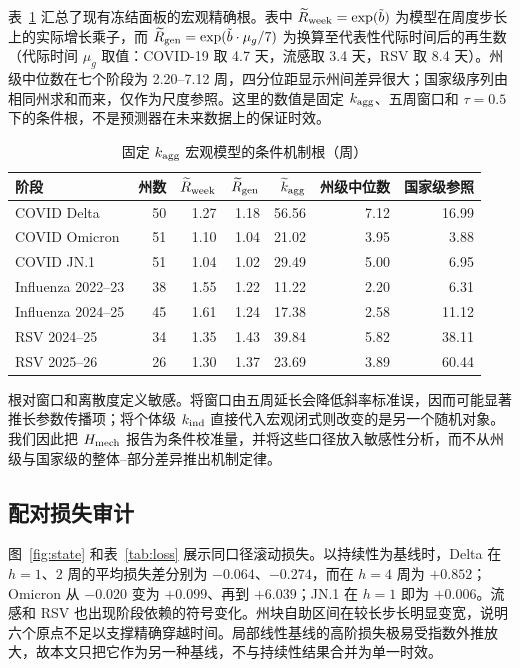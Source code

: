 \documentclass[11pt,a4paper]{article}
\begin{document}
表~\ref{tab:horizons} 汇总了现有冻结面板的宏观精确根。表中 $\widetilde R_{\rm week}=\exp(\tilde b)$ 为模型在周度步长上的实际增长乘子，而 $\widetilde R_{\rm gen}=\exp(\tilde b\cdot\mu_g/7)$ 为换算至代表性代际时间后的再生数（代际时间 $\mu_g$ 取值：COVID-19 取 4.7 天，流感取 3.4 天，RSV 取 8.4 天）。州级中位数在七个阶段为 2.20--7.12 周，四分位距显示州间差异很大；国家级序列由相同州求和而来，仅作为尺度参照。这里的数值是固定 $k_{\rm agg}$、五周窗口和 $\tau=0.5$ 下的条件根，不是预测器在未来数据上的保证时效。

\begin{table}[htbp]
\centering\small
\caption{固定 $k_{\rm agg}$ 宏观模型的条件机制根（周）}\label{tab:horizons}
\begin{tabular}{lrrrrrr}
\toprule
阶段 & 州数 & $\widetilde R_{\rm week}$ & $\widetilde R_{\rm gen}$ & $\widetilde k_{\rm agg}$ & 州级中位数 & 国家级参照\\
\midrule
COVID Delta & 50 & 1.27 & 1.18 & 56.56 & 7.12 & 16.99\\
COVID Omicron & 51 & 1.10 & 1.04 & 21.02 & 3.95 & 3.88\\
COVID JN.1 & 51 & 1.04 & 1.02 & 29.49 & 5.00 & 6.95\\
Influenza 2022--23 & 38 & 1.55 & 1.22 & 11.22 & 2.20 & 6.31\\
Influenza 2024--25 & 45 & 1.61 & 1.24 & 17.38 & 2.58 & 11.12\\
RSV 2024--25 & 34 & 1.35 & 1.43 & 39.84 & 5.82 & 38.11\\
RSV 2025--26 & 26 & 1.30 & 1.37 & 23.69 & 3.89 & 60.44\\
\bottomrule
\end{tabular}
\end{table}

根对窗口和离散度定义敏感。将窗口由五周延长会降低斜率标准误，因而可能显著推长参数传播项；将个体级 $k_{\rm ind}$ 直接代入宏观闭式则改变的是另一个随机对象。我们因此把 $H_{\rm mech}$ 报告为条件校准量，并将这些口径放入敏感性分析，而不从州级与国家级的整体--部分差异推出机制定律。

\subsection{配对损失审计}

图~\ref{fig:state} 和表~\ref{tab:loss} 展示同口径滚动损失。以持续性为基线时，Delta 在 $h=1$、$2$ 周的平均损失差分别为 $-0.064$、$-0.274$，而在 $h=4$ 周为 $+0.852$；Omicron 从 $-0.020$ 变为 $+0.099$、再到 $+6.039$；JN.1 在 $h=1$ 即为 $+0.006$。流感和 RSV 也出现阶段依赖的符号变化。州块自助区间在较长步长明显变宽，说明六个原点不足以支撑精确穿越时间。局部线性基线的高阶损失极易受指数外推放大，故本文只把它作为另一种基线，不与持续性结果合并为单一时效。
\end{document}
